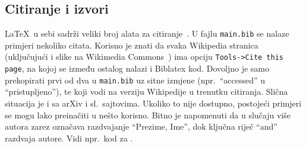 \subsection{Citiranje i izvori}
\LaTeX~u sebi sadrži veliki broj alata za citiranje~\cite{wiki:latex}. U fajlu \texttt{main.bib} se nalaze primjeri nekoliko citata. Korisno je znati da svaka Wikipedia stranica (uključujući i slike na Wikimedia Commons~\cite{wiki:Bernoulli}) ima opciju \texttt{Tools->Cite this page}, na kojoj se između ostalog nalazi i Biblatex kod. Dovoljno je samo prekopirati prvi od dva u \texttt{main.bib} uz sitne izmjene (npr.~``accessed'' u ``pristupljeno''), te koji vodi na verziju Wikipedije u trenutku citiranja. Slična situacija je i sa arXiv i sl.~sajtovima. Ukoliko to nije dostupno, postojeći primjeri se mogu lako preinačiti u nešto korisno. Bitno je napomenuti da u slučaju više autora zarez označava razdvajanje ``Prezime, Ime'', dok ključna riječ ``and'' razdvaja autore. Vidi npr.~kod za \cite{Bender_1998}.